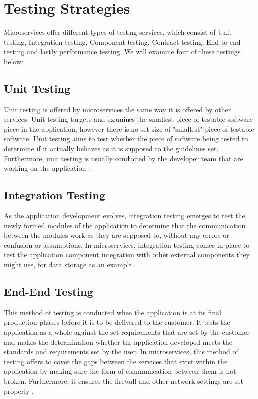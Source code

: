 \documentclass{IEEEtran}
\begin{document}
	\section{Testing Strategies}
		Microservices offer different types of testing services, which consist of Unit testing, Integration testing, Component testing, Contract testing, End-to-end testing and lastly performance testing. We will examine four of these testings below: 

		\subsection{Unit Testing}
			Unit testing is offered by microservices the same way it is offered by other services. Unit testing targets and examines the smallest piece of testable software piece in the application, however there is no set size of "smallest" piece of testable software. Unit testing aims to test whether the piece of software being tested to determine if it actually behaves as it is supposed to the guidelines set. Furthermore, unit testing is usually conducted by the developer team that are working on the application \cite{ibmred}. 
			\newline

		\subsection{Integration Testing}
			As the application development evolves, integration testing emerges to test the newly formed modules of the application to determine that the communication between the modules work as they are supposed to, without any errors or confusion or assumptions. In microservices, integration testing comes in place to test the application component integration with other external components they might use, for data storage as an example \cite{ibmred}. 
			\newline

		\subsection{End-End Testing}
			This method of testing is conducted when the application is at its final production phases before it is to be delivered to the customer. It tests the application as a whole against the set requirements that are set by the customer and makes the determination whether the application developed meets the standards and requirements set by the user. In microservices, this method of testing offers to cover the gaps between the services that exist within the application by making sure the form of communication between them is not broken. Furthermore, it ensures the firewall and other network settings are set properly \cite{ibmred}.
			\newline
\end{document}
